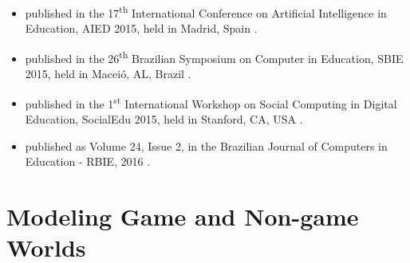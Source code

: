 \begin{itemize}
\item
{} published in the 17\textsuperscript{th} International Conference on Artificial Intelligence in Education, AIED 2015, held in Madrid, Spain \cite{ChallcoMizoguchiBittencourtIsotani2015a}.

\item
{} published in the 26\textsuperscript{th} Brazilian Symposium on Computer in Education, SBIE 2015, held in Maceió, AL, Brazil \cite{ChallcoAndradeOliveiraMizoguchiIsotani2015}.

\item
{} published in the 1\textsuperscript{st} International Workshop on Social Computing in Digital Education, SocialEdu 2015, held in Stanford, CA, USA \cite{ChallcoMizoguchiBittencourtIsotani2015}.

\item
{} published as Volume 24, Issue 2, in the Brazilian Journal of Computers in Education - RBIE, 2016 \cite{ChallcoMizoguchiIsotani2016}.
\end{itemize}

\section{Modeling Game and Non-game Worlds}
\label{sec:modeling-game-non-game-worlds}


